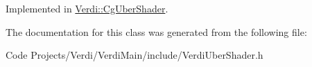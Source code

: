 \-Implemented in \hyperlink{class_verdi_1_1_cg_uber_shader_a6d6ce6cfd0ac5184d3080d28e6acee5a}{\-Verdi\-::\-Cg\-Uber\-Shader}.



\-The documentation for this class was generated from the following file\-:\begin{DoxyCompactItemize}
\item 
\-Code Projects/\-Verdi/\-Verdi\-Main/include/\-Verdi\-Uber\-Shader.\-h\end{DoxyCompactItemize}
